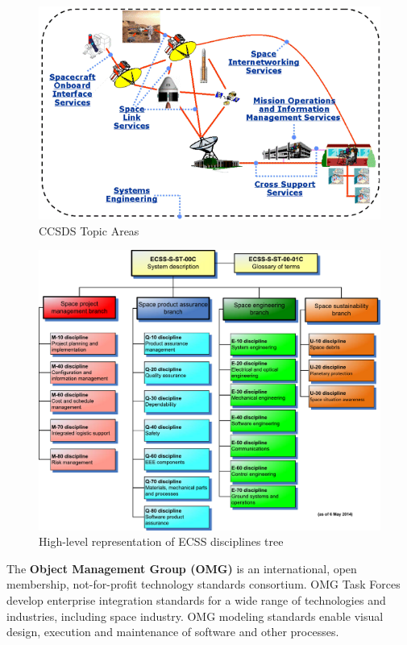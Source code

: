 \begin{figure}[h]
\centering\includegraphics[scale=0.6]{fig/ccsds_topic_areas}
\caption{CCSDS Topic Areas}
\label{fig:CCSDS Topic Areas}
\end{figure}

\begin{figure}[h]
\centering\includegraphics[width=1.0\linewidth]{fig/ecss_disciplines}
\caption{High-level representation of ECSS disciplines tree}
\label{fig:ECSS Disciplines}
\end{figure}

The \textbf{Object Management Group (OMG)} \cite{omg.org} is an international, open membership, not-for-profit technology standards consortium. OMG Task Forces develop enterprise integration standards for a wide range of technologies and industries, including space industry. OMG modeling standards enable visual design, execution and maintenance of software and other processes. 

